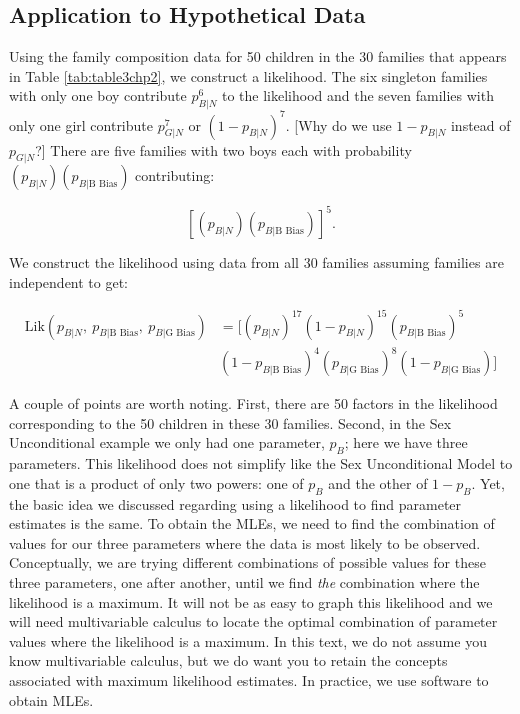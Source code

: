 \documentclass[
]{krantz}
\newcommand{\lik}{\mathrm{Lik}}
\newcommand{\neutral}{p_{B|N}}
\newcommand{\gbias}{p_{B|\textrm{G Bias}}}
\newcommand{\bbias}{p_{B|\textrm{B Bias}}}
\begin{document}
\hypertarget{application-to-hypothetical-data}{%
\subsection{Application to Hypothetical Data}\label{application-to-hypothetical-data}}

Using the family composition data for 50 children in the 30 families that appears in Table \ref{tab:table3chp2}, we construct a likelihood. The six singleton families with only one boy contribute \(\neutral^6\) to the likelihood and the seven families with only one girl contribute \(p_{G|N}^7\) or \((1-\neutral)^7\). {[}Why do we use \(1-\neutral\) instead of \(p_{G|N}\)?{]} There are five families with two boys each with probability \((\neutral)(\bbias)\) contributing:

\[
[(\neutral)(\bbias)]^{5}.
\]

We construct the likelihood using data from all 30 families assuming families are independent to get:

\begin{equation}
\begin{split}
 \lik(\neutral,\ \bbias,\ \gbias) &= 
 \big[(\neutral)^{17}
 (1-\neutral)^{15}
 (\bbias)^{5} \\
 &{}(1-\bbias)^{4}
 (\gbias)^{8}
 (1-\gbias) \big]
\end{split}
\label{eq:lik50}
\end{equation}

A couple of points are worth noting. First, there are 50 factors in the likelihood corresponding to the 50 children in these 30 families. Second, in the Sex Unconditional example we only had one parameter, \(p_{B}\); here we have three parameters. This likelihood does not simplify like the Sex Unconditional Model to one that is a product of only two powers: one of \(p_B\) and the other of \(1-p_B\). Yet, the basic idea we discussed regarding using a likelihood to find parameter estimates is the same. To obtain the MLEs, we need to find the combination of values for our three parameters where the data is most likely to be observed. Conceptually, we are trying different combinations of possible values for these three parameters, one after another, until we find \emph{the} combination where the likelihood is a maximum. It will not be as easy to graph this likelihood and we will need multivariable calculus to locate the optimal combination of parameter values where the likelihood is a maximum. In this text, we do not assume you know multivariable calculus, but we do want you to retain the concepts associated with maximum likelihood estimates. In practice, we use software to obtain MLEs.
\end{document}

